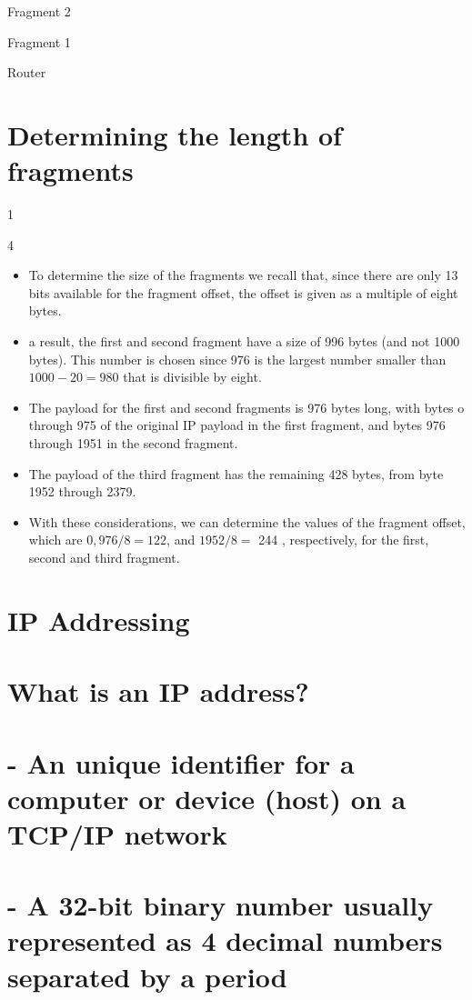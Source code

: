 \documentclass[10pt]{article}
\begin{document}
Fragment 2

Fragment 1

Router

\section{Determining the length of fragments}
1

4

\begin{itemize}
  \item To determine the size of the fragments we recall that, since there are only 13 bits available for the fragment offset, the offset is given as a multiple of eight bytes.

  \item a result, the first and second fragment have a size of 996 bytes (and not 1000 bytes). This number is chosen since 976 is the largest number smaller than $1000-20=980$ that is divisible by eight.

  \item The payload for the first and second fragments is 976 bytes long, with bytes o through 975 of the original IP payload in the first fragment, and bytes 976 through 1951 in the second fragment.

  \item The payload of the third fragment has the remaining 428 bytes, from byte 1952 through 2379.

  \item With these considerations, we can determine the values of the fragment offset, which are $0,976 / 8=122$, and $1952 / 8=$ 244 , respectively, for the first, second and third fragment.

\end{itemize}

\section{IP Addressing}
\section*{What is an IP address? }
\section{- An unique identifier for a computer or device (host) on a TCP/IP network}
\section{- A 32-bit binary number usually represented as 4 decimal numbers separated by a period}
\end{document}
